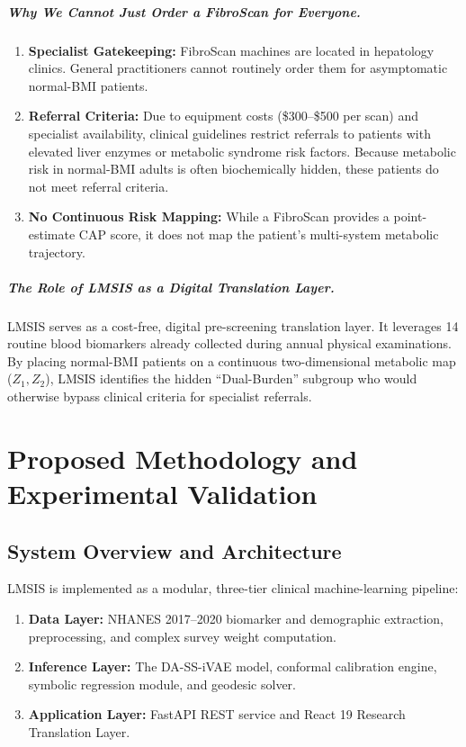 \documentclass[12pt,a4paper,oneside]{report}
\newcommand{\daivae}{DA-SS-iVAE}
\begin{document}
\paragraph{Why We Cannot Just Order a FibroScan for Everyone.}
\begin{enumerate}[leftmargin=*]
    \item \textbf{Specialist Gatekeeping:} FibroScan machines are located in hepatology clinics. General practitioners cannot routinely order them for asymptomatic normal-BMI patients.
    \item \textbf{Referral Criteria:} Due to equipment costs (\$300--\$500 per scan) and specialist availability, clinical guidelines restrict referrals to patients with elevated liver enzymes or metabolic syndrome risk factors. Because metabolic risk in normal-BMI adults is often biochemically hidden, these patients do not meet referral criteria.
    \item \textbf{No Continuous Risk Mapping:} While a FibroScan provides a point-estimate CAP score, it does not map the patient's multi-system metabolic trajectory.
\end{enumerate}

\paragraph{The Role of LMSIS as a Digital Translation Layer.} LMSIS serves as a cost-free, digital pre-screening translation layer. It leverages 14 routine blood biomarkers already collected during annual physical examinations. By placing normal-BMI patients on a continuous two-dimensional metabolic map ($Z_1, Z_2$), LMSIS identifies the hidden ``Dual-Burden'' subgroup who would otherwise bypass clinical criteria for specialist referrals.

\chapter{Proposed Methodology and Experimental Validation}

\section{System Overview and Architecture}

LMSIS is implemented as a modular, three-tier clinical machine-learning pipeline:
\begin{enumerate}[leftmargin=*]
    \item \textbf{Data Layer:} NHANES 2017--2020 biomarker and demographic extraction, preprocessing, and complex survey weight computation.
    \item \textbf{Inference Layer:} The \daivae{} model, conformal calibration engine, symbolic regression module, and geodesic solver.
    \item \textbf{Application Layer:} FastAPI REST service and React 19 Research Translation Layer.
\end{enumerate}
\end{document}
